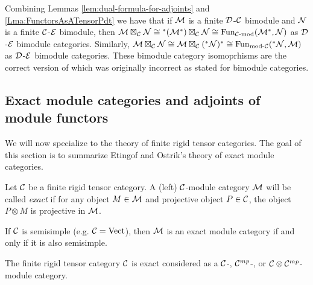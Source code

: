 \documentclass{amsart}
\begin{document}
\begin{remark}
Combining Lemmas \ref{lem:dual-formula-for-adjoints} and \ref{Lma:FunctorsAsATensorPdt} we have that if $\mathcal M$ is a finite $\mathcal D$-$\mathcal C$ bimodule and $\mathcal N$ is a finite $\mathcal C$-$\mathcal E$ bimodule, then $\mathcal M \boxtimes_\mathcal C \mathcal N \cong {}^*(\mathcal M^*) \boxtimes_\mathcal C \mathcal N \cong \operatorname{Fun}_{\mathcal C\text{-mod}}(\mathcal M^*,\mathcal N)$ as $\mathcal D$-$\mathcal E$ bimodule categories.   Similarly, $\mathcal M \boxtimes_{\mathcal C} \mathcal N \cong \mathcal M \boxtimes_\mathcal C ({}^*\mathcal N)^* \cong \operatorname{Fun}_{\text{mod-}\mathcal C}({}^*\mathcal N,\mathcal M)$ as $\mathcal D$-$\mathcal E$ bimodule categories.  These bimodule category isomoprhisms are the correct version of \cite[Remark 3.6]{0909.3140} which was originally incorrect as stated for bimodule categories.
\end{remark}


\subsection{Exact module categories and adjoints of module functors}
We will now specialize to the theory of finite rigid tensor categories.  The goal of this section is to summarize Etingof and Ostrik's theory of exact module categories.

\begin{definition}
	Let $\mathcal C$ be a finite rigid tensor category. A (left) $\mathcal C$-module category $\mathcal M$ will be called {\em exact} if for any object $M \in \mathcal M$ and  projective object $P \in \mathcal C$, the object $P \otimes M$ is projective in $\mathcal M$. 
\end{definition}

\begin{example}
	If $\mathcal C$ is semisimple (e.g. $\mathcal C = \mathrm{Vect}$), then $\mathcal M$ is an exact module category if and only if it is also semisimple.
\end{example}

\begin{example}
	The finite rigid tensor category $\mathcal C$ is exact considered as a $\mathcal C$-, $\mathcal C^{mp}$-, or $\mathcal C \otimes \mathcal C^{mp}$-module category. 
\end{example}
\end{document}
